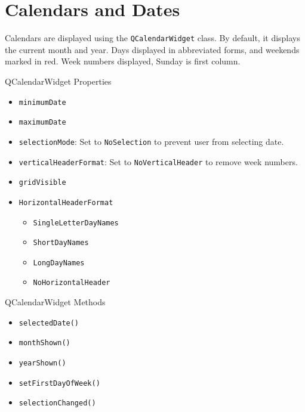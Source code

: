 \documentclass[notes.tex]{subfiles}
\begin{document}
		\section{Calendars and Dates}
			Calendars are displayed using the \verb|QCalendarWidget| class. By default, it displays the current month and year. Days displayed in abbreviated forms, and weekends marked in red. Week numbers displayed, Sunday is first column.
			\begin{sidenote}{QCalendarWidget Properties}
				\begin{itemize}[nosep]
					\item \verb|minimumDate|
					\item \verb|maximumDate|
					\item \verb|selectionMode|: Set to \verb|NoSelection| to prevent user from selecting date.
					\item \verb|verticalHeaderFormat|: Set to \verb|NoVerticalHeader| to remove week numbers.
					\item \verb|gridVisible|
					\item \verb|HorizontalHeaderFormat|
						\begin{itemize}[nosep]
							\item \verb|SingleLetterDayNames|
							\item \verb|ShortDayNames|
							\item \verb|LongDayNames|
							\item \verb|NoHorizontalHeader|
						\end{itemize}
				\end{itemize}
			\end{sidenote}
			\begin{sidenote}{QCalendarWidget Methods}
				\vspace{-0.5cm}
				\begin{multicols}{2}
					\begin{itemize}[nosep]
						\item \verb|selectedDate()|
						\item \verb|monthShown()|
						\item \verb|yearShown()|
						\item \verb|setFirstDayOfWeek()|
						\item \verb|selectionChanged()|
					\end{itemize}
				\end{multicols}
			\end{sidenote}
\end{document}
